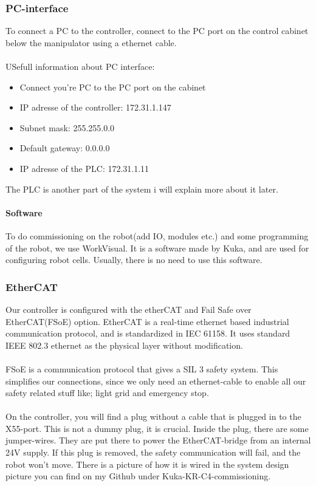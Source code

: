 \documentclass{article}
\begin{document}
        \subsubsection{PC-interface}
       To connect a PC to the controller, connect to the PC port on the control cabinet below the manipulator using a ethernet cable. 
        \\\\
        USefull information about PC interface:
        \begin{itemize}
            \item Connect you're PC to the PC port on the cabinet
            \item IP adresse of the controller: 172.31.1.147
            \item Subnet mask:                  255.255.0.0
            \item Default gateway:              0.0.0.0
            \item IP adresse of the PLC: 172.31.1.11 
        \end{itemize}
        The PLC is another part of the system i will explain more about it later. 
        \paragraph{Software}
         To do commissioning on the robot(add IO, modules etc.) and some programming of the robot, we use WorkVisual. It is a software made by Kuka, and are used for configuring robot cells. Usually, there is no need to use this software.
         
        \subsubsection{EtherCAT}
        Our controller is configured with the etherCAT and Fail Safe over EtherCAT(FSoE) option. EtherCAT is a real-time ethernet based industrial communication protocol, and is standardized in IEC 61158. It uses standard IEEE 802.3 ethernet as the physical layer without modification. 
        \\\\
        FSoE is a communication protocol that gives a SIL 3 safety system. This simplifies our connections, since we only need an ethernet-cable to enable all our safety related stuff like; light grid and emergency stop. 
        \\\\
        On the controller, you will find a plug without a cable that is plugged in to the X55-port. This is not a dummy plug, it is crucial. Inside the plug, there are some jumper-wires. They are put there to power the EtherCAT-bridge from an internal 24V supply. If this plug is removed, the safety communication will fail, and the robot won't move. There is a picture of how it is wired in the system design picture you can find on my Github under Kuka-KR-C4-commissioning.
        
\end{document}
